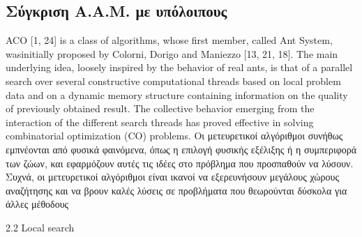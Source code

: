 \subsection{Σύγκριση Α.Α.Μ. με υπόλοιπους}
ACO [1, 24] is a class of algorithms, whose first member, called Ant System, wasinitially proposed by Colorni, Dorigo and Maniezzo [13, 21, 18]. The main underlying idea, loosely inspired by the behavior of real ants, is that of a parallel search over several constructive computational threads based on local problem data and on a dynamic memory structure containing information on the quality of previously obtained result. The collective behavior emerging from the interaction of the different search threads has proved effective in solving combinatorial optimization (CO) problems. Οι μετευρετικοί αλγόριθμοι συνήθως εμπνέονται από φυσικά φαινόμενα, όπως η επιλογή φυσικής εξέλιξης ή η συμπεριφορά των ζώων, και εφαρμόζουν αυτές τις ιδέες στο πρόβλημα που προσπαθούν να λύσουν. Συχνά, οι μετευρετικοί αλγόριθμοι είναι ικανοί να εξερευνήσουν μεγάλους χώρους αναζήτησης και να βρουν καλές λύσεις σε προβλήματα που θεωρούνται δύσκολα για άλλες μέθοδους


2.2 Local search \cite{Dorigo-Stutzle}

